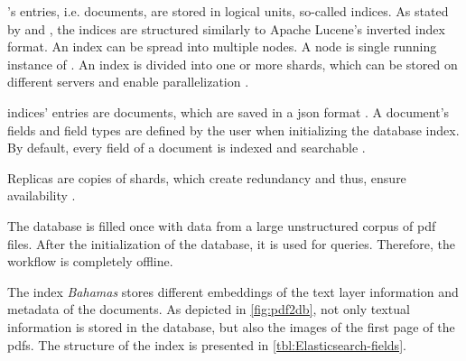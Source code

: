 \databaseName{}'s entries, i.e. documents, are stored in logical units, so-called indices.
As stated by \citeauthor{Elasticsearch2019} and \citeauthor{Elasticsearch2017}, the indices are structured similarly to Apache Lucene's inverted index format.
An index can be spread into multiple nodes.
A node is single running instance of \databaseName{} \cite{Elasticsearch2019}.
An index is divided into one or more shards, which can be stored on different servers and enable parallelization \cite{Elasticsearch2019}.

\databaseName{} indices' entries are documents, which are saved in a \ac{json} format \cite{Elasticsearch2017}.
A document's fields and field types are defined by the user when initializing the database index.
By default, every field of a document is indexed and searchable \cite{Elasticsearch2019}.

Replicas are copies of shards, which create redundancy and thus, ensure availability \cite{Elasticsearch2019}.

The database is filled once with data from a large unstructured corpus of \ac{pdf} files.
After the initialization of the database, it is used for queries. 
Therefore, the workflow is completely offline.

The index \textit{Bahamas} stores different embeddings of the text layer information and metadata of the documents.
As depicted in \autoref{fig:pdf2db}, not only textual information is stored in the database, but also the images of the first page of the \acp{pdf}.
The structure of the index is presented in \autoref{tbl:Elasticsearch-fields}.


